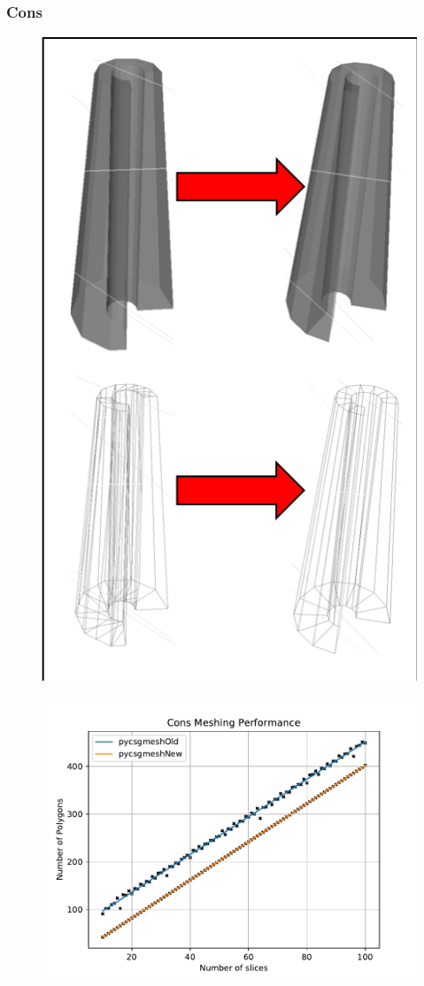 \documentclass[12pt,a4paper]{article}
\begin{document}
\subsubsection{Cons}
\begin{figure}[h!]
\centering
\begin{minipage}{.2\textwidth}
  \centering
  \includegraphics[height=1\linewidth]{Images//Meshes//cons.png}
  \label{fig:test1}
\end{minipage}%
\begin{minipage}{.3\textwidth}
  \centering
  \includegraphics[scale=0.35]{Images//Quad_fits//Cons_quad.pdf}
  \label{fig:test2}
\end{minipage}%
\end{figure}
\end{document}
